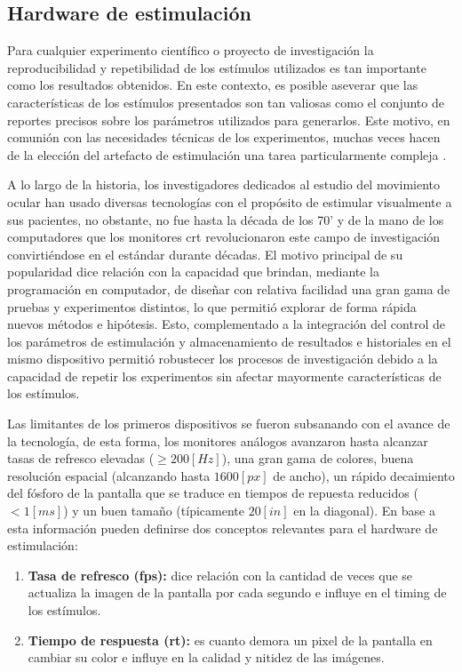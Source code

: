 \documentclass[../main.tex]{subfiles}
\begin{document}
		\subsection{Hardware de estimulación}
		\label{sub:02_hardware_de_estimulacion}

			Para cualquier experimento científico o proyecto de investigación la reproducibilidad y repetibilidad de los estímulos utilizados es tan importante como los resultados obtenidos. En este contexto, es posible aseverar que las características de los estímulos presentados son tan valiosas como el conjunto de reportes precisos sobre los parámetros utilizados para generarlos. Este motivo, en comunión con las necesidades técnicas de los experimentos, muchas veces hacen de la elección del artefacto de estimulación una tarea particularmente compleja \cite{article:monitor_beuer}.

			A lo largo de la historia, los investigadores dedicados al estudio del movimiento ocular han usado diversas tecnologías con el propósito de estimular visualmente a sus pacientes, no obstante, no fue hasta la década de los 70' y de la mano de los computadores que los monitores \acrshort{crt} revolucionaron este campo de investigación convirtiéndose en el estándar durante décadas. El motivo principal de su popularidad dice relación con la capacidad que brindan, mediante la programación en computador, de diseñar con relativa facilidad una gran gama de pruebas y experimentos distintos, lo que permitió explorar de forma rápida nuevos métodos e hipótesis. Esto, complementado a la integración del control de los parámetros de estimulación y almacenamiento de resultados e historiales en el mismo dispositivo permitió robustecer los procesos de investigación debido a la capacidad de repetir los experimentos sin afectar mayormente características de los estímulos. 

			Las limitantes de los primeros dispositivos se fueron subsanando con el avance de la tecnología, de esta forma, los monitores análogos avanzaron hasta alcanzar tasas de refresco elevadas ($\geq 200[Hz]$), una gran gama de colores, buena resolución espacial (alcanzando hasta $1600[px]$ de ancho), un rápido decaimiento del fósforo de la pantalla que se traduce en tiempos de repuesta reducidos ($< 1[ms]$) y un buen tamaño (típicamente $20[in]$ en la diagonal). En base a esta información pueden definirse dos conceptos relevantes para el hardware de estimulación: 
			\begin{enumerate}
				\item \textbf{Tasa de refresco (\acrshort{fps}):} dice relación con la cantidad de veces que se actualiza la imagen de la pantalla por cada segundo e influye en el timing de los estímulos.
				\item \textbf{Tiempo de respuesta (\acrshort{rt}):} es cuanto demora un pixel de la pantalla en cambiar su color e influye en la calidad y nitidez de las imágenes. 
			\end{enumerate}
\end{document}
